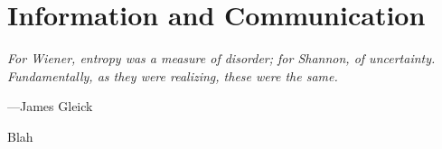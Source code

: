 


\toclineskip
\section{Information and Communication}

\vspace{4mm}
\begin{displayquote}
	\textit{For Wiener, entropy was a measure of disorder; for Shannon, of uncertainty. Fundamentally, as they were realizing, these were the same.}
	\vspace{2mm}
	\begin{flushright}
		---James Gleick
	\end{flushright}
\end{displayquote}
\vspace{4mm}



Blah


